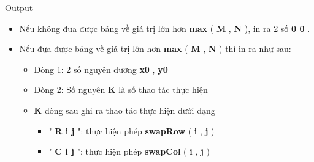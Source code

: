 Output  
\begin{itemize}
	\item     Nếu không đưa được bảng về giá trị lớn hơn    \textbf{     max    }    (    \textbf{     M    }    ,    \textbf{     N    }    ), in ra 2 số    \textbf{     0 0    }    .   
	\item     Nếu đưa được bảng về giá trị lớn hơn    \textbf{     max    }    (    \textbf{     M    }    ,    \textbf{     N    }    ) thì in ra như sau:    
\begin{itemize}
	\item       Dòng 1: 2 số nguyên dương      \textbf{       x0      }      ,      \textbf{       y0      }
	\item       Dòng 2: Số nguyên      \textbf{       K      }      là số thao tác thực hiện     
	\item \textbf{       K      }      dòng sau ghi ra thao tác thực hiện dưới dạng      
\begin{itemize}
	\item         "        \textbf{         R i j        }        ": thực hiện phép        \textbf{         swapRow        }        (        \textbf{         i        }        ,        \textbf{         j        }        )       
	\item         "        \textbf{         C i j        }        ": thực hiện phép        \textbf{         swapCol        }        (        \textbf{         i        }        ,        \textbf{         j        }        )       
\end{itemize}
\end{itemize}
\end{itemize}